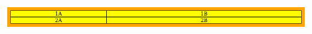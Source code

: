 \begin{frame}
    \begin{center}
        \includegraphics[width=\textwidth]{racs1.png} \\
    \end{center}
    \begin{columns}[T]
            \begin{exampleblock}{}
                \vspace{-.3cm}
                \scriptsize
                
                \vspace{-.3cm}
            \end{exampleblock}
            \begin{exampleblock}{}
                \vspace{-.3cm}
                \scriptsize
                
                \vspace{-.3cm}
            \end{exampleblock}
    \end{columns}
\end{frame}

